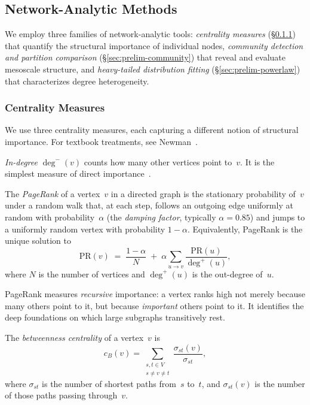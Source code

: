 \subsection{Network-Analytic Methods}
\label{sec:prelim-network}

We employ three families of network-analytic tools: \emph{centrality measures} (\S\ref{sec:prelim-centrality}) that quantify the structural importance of individual nodes, \emph{community detection and partition comparison} (\S\ref{sec:prelim-community}) that reveal and evaluate mesoscale structure, and \emph{heavy-tailed distribution fitting} (\S\ref{sec:prelim-powerlaw}) that characterizes degree heterogeneity.

\subsubsection{Centrality Measures}
\label{sec:prelim-centrality}

We use three centrality measures, each capturing a different notion of structural importance. For textbook treatments, see Newman~\cite[\S\S7.1, 7.4, 7.7]{newman2010}.

\emph{In-degree} $\deg^{-}(v)$ counts how many other vertices point to~$v$. It is the simplest measure of direct importance~\cite[\S7.1]{newman2010}.

\begin{definition}
\label{def:pagerank}
The \emph{PageRank} of a vertex~$v$ in a directed graph is the stationary probability of~$v$ under a random walk that, at each step, follows an outgoing edge uniformly at random with probability~$\alpha$ (the \emph{damping factor}, typically $\alpha = 0.85$) and jumps to a uniformly random vertex with probability $1 - \alpha$.  Equivalently, PageRank is the unique solution to
\[
  \mathrm{PR}(v) \;=\; \frac{1-\alpha}{N} \;+\; \alpha \sum_{u \to v} \frac{\mathrm{PR}(u)}{\deg^{+}(u)},
\]
where $N$ is the number of vertices and $\deg^{+}(u)$ is the out-degree of~$u$.
\end{definition}

PageRank measures \emph{recursive} importance: a vertex ranks high not merely because many others point to it, but because \emph{important} others point to it. It identifies the deep foundations on which large subgraphs transitively rest.

\begin{definition}
\label{def:betweenness}
The \emph{betweenness centrality} of a vertex~$v$ is
\[
  c_B(v) = \sum_{\substack{s, t \in V \\ s \ne v \ne t}} \frac{\sigma_{st}(v)}{\sigma_{st}},
\]
where $\sigma_{st}$ is the number of shortest paths from~$s$ to~$t$, and $\sigma_{st}(v)$ is the number of those paths passing through~$v$.
\end{definition}

